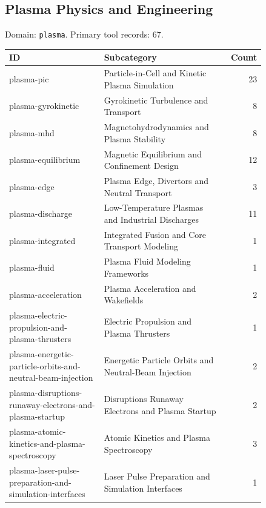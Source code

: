 \subsection{Plasma Physics and Engineering}
\noindent Domain: \texttt{plasma}. Primary tool records: 67.
\begin{longtable}{p{0.37\linewidth}p{0.47\linewidth}r}
ID & Subcategory & Count\\\hline\endhead
plasma-pic & Particle-in-Cell and Kinetic Plasma Simulation & 23\\
plasma-gyrokinetic & Gyrokinetic Turbulence and Transport & 8\\
plasma-mhd & Magnetohydrodynamics and Plasma Stability & 8\\
plasma-equilibrium & Magnetic Equilibrium and Confinement Design & 12\\
plasma-edge & Plasma Edge, Divertors and Neutral Transport & 3\\
plasma-discharge & Low-Temperature Plasmas and Industrial Discharges & 11\\
plasma-integrated & Integrated Fusion and Core Transport Modeling & 1\\
plasma-fluid & Plasma Fluid Modeling Frameworks & 1\\
plasma-acceleration & Plasma Acceleration and Wakefields & 2\\
plasma-electric-propulsion-and-plasma-thrusters & Electric Propulsion and Plasma Thrusters & 1\\
plasma-energetic-particle-orbits-and-neutral-beam-injection & Energetic Particle Orbits and Neutral-Beam Injection & 2\\
plasma-disruptions-runaway-electrons-and-plasma-startup & Disruptions Runaway Electrons and Plasma Startup & 2\\
plasma-atomic-kinetics-and-plasma-spectroscopy & Atomic Kinetics and Plasma Spectroscopy & 3\\
plasma-laser-pulse-preparation-and-simulation-interfaces & Laser Pulse Preparation and Simulation Interfaces & 1\\
\end{longtable}
